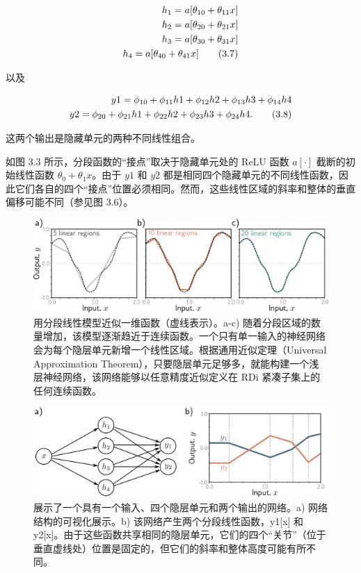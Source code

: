\begin{align}
	h_1 = a[\theta_{10} + \theta_{11}x] \notag \\
	h_2 = a[\theta_{20} + \theta_{21}x] \notag \\
	h_3 = a[\theta_{30} + \theta_{31}x] \notag \\
	h_4 = a[\theta_{40} + \theta_{41}x]  \tag{3.7}
\end{align} 

以及

\begin{align}
	y1 = \phi_{10} + \phi_{11}h1 + \phi_{12}h2 + \phi_{13}h3 + \phi_{14}h4 \notag \\
	y2 = \phi_{20} + \phi_{21}h1 + \phi_{22}h2 + \phi_{23}h3 + \phi_{24}h4. \tag{3.8}
\end{align} 


这两个输出是隐藏单元的两种不同线性组合。

如图 3.3 所示，分段函数的“接点”取决于隐藏单元处的 ReLU 函数 \(a[\cdot]\) 截断的初始线性函数 \(\theta_0 + \theta_1x\)。由于 \(y1\) 和 \(y2\) 都是相同四个隐藏单元的不同线性函数，因此它们各自的四个“接点”位置必须相同。然而，这些线性区域的斜率和整体的垂直偏移可能不同（参见图 3.6）。

\begin{figure}[ht!]
	\centering
	\includegraphics[width=0.7\linewidth]{png/chapter3/ShallowApproximate.png}
\caption{用分段线性模型近似一维函数（虚线表示）。a-c) 随着分段区域的数量增加，该模型逐渐趋近于连续函数。一个只有单一输入的神经网络会为每个隐层单元新增一个线性区域。根据通用近似定理（Universal Approximation Theorem），只要隐层单元足够多，就能构建一个浅层神经网络，该网络能够以任意精度近似定义在 RDi 紧凑子集上的任何连续函数。}
\end{figure}

\begin{figure}[ht!]
	\centering
	\includegraphics[width=0.7\linewidth]{png/chapter3/ShallowNetTwoOutputs.png}
\caption{展示了一个具有一个输入、四个隐层单元和两个输出的网络。a) 网络结构的可视化展示。b) 该网络产生两个分段线性函数，y1[x] 和 y2[x]。由于这些函数共享相同的隐层单元，它们的四个“关节”（位于垂直虚线处）位置是固定的，但它们的斜率和整体高度可能有所不同。}
\end{figure}

